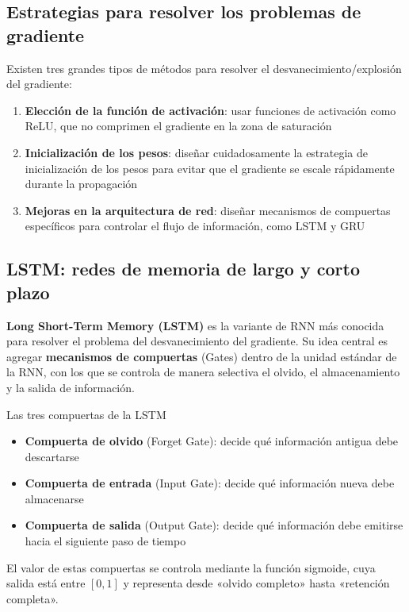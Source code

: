 \subsection{Estrategias para resolver los problemas de gradiente}

Existen tres grandes tipos de métodos para resolver el desvanecimiento/explosión del gradiente:

\begin{enumerate}
    \item \textbf{Elección de la función de activación}: usar funciones de activación como ReLU, que no comprimen el gradiente en la zona de saturación
    \item \textbf{Inicialización de los pesos}: diseñar cuidadosamente la estrategia de inicialización de los pesos para evitar que el gradiente se escale rápidamente durante la propagación
    \item \textbf{Mejoras en la arquitectura de red}: diseñar mecanismos de compuertas específicos para controlar el flujo de información, como LSTM y GRU
\end{enumerate}

\subsection{LSTM: redes de memoria de largo y corto plazo}

\textbf{Long Short-Term Memory (LSTM)} es la variante de RNN más conocida para resolver el problema del desvanecimiento del gradiente. Su idea central es agregar \textbf{mecanismos de compuertas} (Gates) dentro de la unidad estándar de la RNN, con los que se controla de manera selectiva el olvido, el almacenamiento y la salida de información.

\begin{importantbox}{Las tres compuertas de la LSTM}
\begin{itemize}
    \item \textbf{Compuerta de olvido} (Forget Gate): decide qué información antigua debe descartarse
    \item \textbf{Compuerta de entrada} (Input Gate): decide qué información nueva debe almacenarse
    \item \textbf{Compuerta de salida} (Output Gate): decide qué información debe emitirse hacia el siguiente paso de tiempo
\end{itemize}
El valor de estas compuertas se controla mediante la función sigmoide, cuya salida está entre $[0, 1]$ y representa desde «olvido completo» hasta «retención completa».
\end{importantbox}

